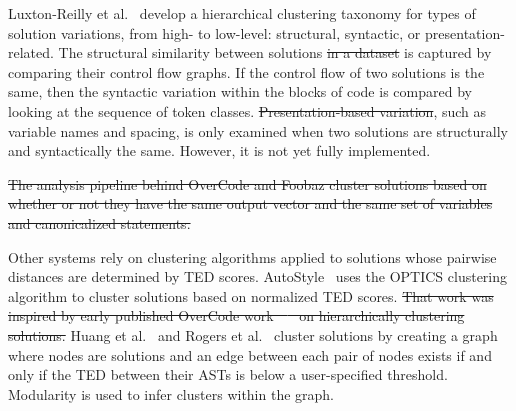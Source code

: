 \documentclass[12pt,twoside]{mitthesis}
\providecommand{\DIFaddtex}[1]{{\protect\color{blue}\uwave{#1}}} %
\providecommand{\DIFdeltex}[1]{{\protect\color{red}\sout{#1}}}                      %
\providecommand{\DIFaddbegin}{} %
\providecommand{\DIFaddend}{} %
\providecommand{\DIFdelbegin}{} %
\providecommand{\DIFdelend}{} %
\providecommand{\DIFadd}[1]{\texorpdfstring{\DIFaddtex{#1}}{#1}} %
\providecommand{\DIFdel}[1]{\texorpdfstring{\DIFdeltex{#1}}{}} %
\begin{document}
Luxton-Reilly et al.~\cite{Luxton13} develop a hierarchical clustering taxonomy for types of solution variations, from high- to low-level: structural, syntactic, or presentation-related. The structural similarity between solutions \DIFdelbegin \DIFdel{in a dataset }\DIFdelend is captured by comparing their control flow graphs. If the control flow of two solutions is the same, then the syntactic variation within the blocks of code is compared by looking at the sequence of token classes. \DIFdelbegin \DIFdel{Presentation-based variation}\DIFdelend \DIFaddbegin \DIFadd{Variation in presentation}\DIFaddend , such as variable names and spacing, is only examined when two solutions are structurally and syntactically the same. However, it is not yet fully implemented. %

\DIFdelbegin \DIFdel{The analysis pipeline behind OverCode and Foobaz cluster solutions based on whether or not they have the same output vector and the same set of variables and canonicalized statements. }\DIFdelend %
\DIFaddbegin 

\DIFaddend Other systems rely on clustering algorithms applied to solutions whose pairwise distances are determined by TED scores. AutoStyle~\cite{choudhury2016autostyle} uses the OPTICS clustering algorithm to cluster solutions based on normalized TED scores. \DIFdelbegin \DIFdel{That work was inspired by early published OverCode work~\mbox{%
\cite{glassman2014feature} }%
on hierarchically clustering solutions. }\DIFdelend Huang et al.~\cite{MOOCshop} and Rogers et al.~\cite{ACESthesis} cluster solutions by creating a graph where nodes are solutions and an edge between each pair of nodes exists if and only if the TED between their ASTs is below a user-specified threshold. Modularity is used to infer clusters within the graph. 
\end{document}
